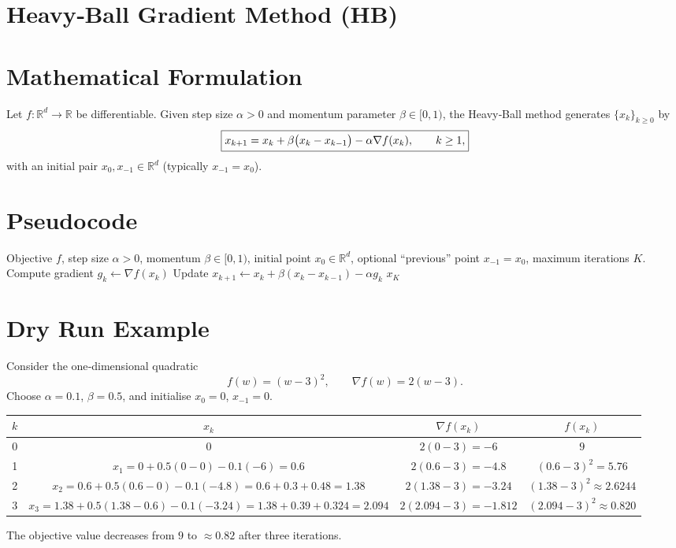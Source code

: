 \documentclass{article}
\begin{document}
\section*{Heavy‑Ball Gradient Method (HB)}

\section*{Mathematical Formulation}
Let $f:\mathbb{R}^d\to\mathbb{R}$ be differentiable.  
Given step size $\alpha>0$ and momentum parameter $\beta\in[0,1)$, the Heavy‑Ball method generates $\{x_k\}_{k\ge 0}$ by  
\[
\boxed{%
x_{k+1}=x_k+\beta\bigl(x_k-x_{k-1}\bigr)-\alpha\nabla f(x_k),\qquad k\ge 1,
}
\]
with an initial pair $x_0,x_{-1}\in\mathbb{R}^d$ (typically $x_{-1}=x_0$).

\section*{Pseudocode}
\begin{algorithm}[H]
\caption{Heavy‑Ball Gradient Method}
\begin{algorithmic}[1]
\REQUIRE Objective $f$, step size $\alpha>0$, momentum $\beta\in[0,1)$,
initial point $x_0\in\mathbb{R}^d$, optional ``previous'' point $x_{-1}=x_0$,
maximum iterations $K$.
    \STATE Compute gradient $g_k\gets \nabla f(x_k)$
    \STATE Update $x_{k+1}\gets x_k+\beta (x_k-x_{k-1})-\alpha g_k$
\ENDFOR
\RETURN $x_{K}$
\end{algorithmic}
\end{algorithm}

\section*{Dry Run Example}
Consider the one‑dimensional quadratic
\[
f(w)=(w-3)^2,\qquad \nabla f(w)=2(w-3).
\]
Choose $\alpha=0.1$, $\beta=0.5$, and initialise $x_0=0$, $x_{-1}=0$.

\begin{center}
\begin{tabular}{c|c|c|c}
$k$ & $x_k$ & $\nabla f(x_k)$ & $f(x_k)$\\ \hline
0 & $0$ & $2(0-3)=-6$ & $9$\\
1 & $x_1=0+0.5(0-0)-0.1(-6)=0.6$ & $2(0.6-3)=-4.8$ & $(0.6-3)^2=5.76$\\
2 & $x_2=0.6+0.5(0.6-0)-0.1(-4.8)=0.6+0.3+0.48=1.38$ &
$2(1.38-3)=-3.24$ & $(1.38-3)^2\approx2.6244$\\
3 & $x_3=1.38+0.5(1.38-0.6)-0.1(-3.24)=1.38+0.39+0.324=2.094$ &
$2(2.094-3)=-1.812$ & $(2.094-3)^2\approx0.820$\\
\end{tabular}
\end{center}
The objective value decreases from $9$ to $\approx0.82$ after three iterations.
\end{document}
